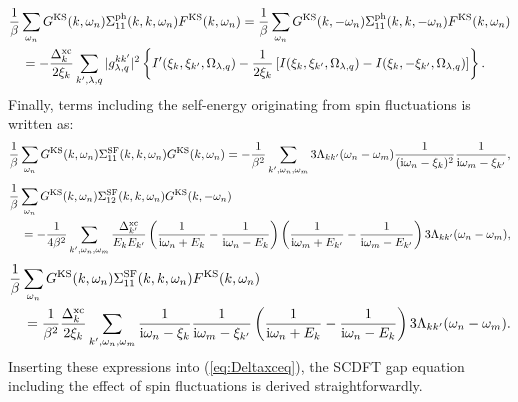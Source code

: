 %
\begin{equation}
	\begin{split}
	&\frac{1}{\beta} \sum_{\omega_n}G^{\rm KS}(k,\omega_n)\Sigma^{\rm ph}_{11}(k,k,\omega_n)F^{\rm KS}(k,\omega_n)
	=\frac{1}{\beta} \sum_{\omega_n}G^{\rm KS}(k,-\omega_n)\Sigma^{\rm ph}_{11}(k,k,-\omega_n)F^{\rm KS}(k,\omega_n)\\
	& \quad = -
	\frac{\Delta^{\rm xc}_{k}}{2\xi_{k}} \sum_{k',\lambda,q} |g^{kk'}_{\lambda,q}|^2
	\left\{ I'(\xi_k,\xi_{k'},\Omega_{\lambda,q})-\frac{1}{2\xi_k}
	\left[ I(\xi_k,\xi_{k'},\Omega_{\lambda,q}) - I(\xi_k,-\xi_{k'},\Omega_{\lambda,q}) \right]\right\}.
	\label{eq:ph11sum2}
	\end{split}
\end{equation}
%
Finally, terms including the self-energy originating from spin fluctuations is written as:
%
\begin{equation}
	\frac{1}{\beta} \sum_{\omega_n}G^{\rm KS}(k,\omega_n)\Sigma^{\rm SF}_{11}(k,k,\omega_n)G^{\rm KS}(k,\omega_n)
	= - \frac{1}{\beta^2}\sum_{k',\omega_n,\omega_m}
	3\Lambda_{kk'}(\omega_n-\omega_m)\frac{1}{({\rm i}\omega_n -\xi_{k})^2}\frac{1}{ {\rm i}\omega_m - \xi_{k'}},
	\label{eq:SF11sum1}
\end{equation}
%
\begin{equation}
	\begin{split}
	&\frac{1}{\beta} \sum_{\omega_n}G^{\rm KS}(k,\omega_n)\Sigma^{\rm SF}_{12}(k,k,\omega_n)G^{\rm KS}(k,-\omega_n)\\
	& \quad = -
	\frac{1}{4\beta^2}\sum_{k',\omega_n,\omega_m}\frac{\Delta^{\rm xc}_{k'}}{E_{k}E_{k'}}
	\left( \frac{1}{ {\rm i}\omega_n+E_k} - \frac{1}{ {\rm i}\omega_n-E_k} \right)
	\left( \frac{1}{ {\rm i}\omega_m+E_{k'}} - \frac{1}{ {\rm i}\omega_m-E_{k'}} \right)
	3\Lambda_{kk'}(\omega_n-\omega_m),
	\label{eq:SF12sum}
	\end{split}
\end{equation}
%
\begin{equation}
\begin{split}
	&\frac{1}{\beta} \sum_{\omega_n}G^{\rm KS}(k,\omega_n)\Sigma^{\rm SF}_{11}(k,k,\omega_n)F^{\rm KS}(k,\omega_n) \\
	&\quad =
	\frac{1}{\beta^2}\frac{\Delta^{\rm xc}_{k}}{2\xi_{k}}\sum_{k',\omega_n,\omega_m}
	\frac{1}{ {\rm i}\omega_n-\xi_k}\frac{1}{ {\rm i}\omega_m-\xi_{k'}}
	\left( \frac{1}{ {\rm i}\omega_n+E_k} - \frac{1}{ {\rm i}\omega_n-E_k} \right)
	3\Lambda_{kk'}(\omega_n-\omega_m).
	\label{eq:SF11sum2}
	\end{split}
\end{equation}
%
Inserting these expressions into (\ref{eq:Deltaxceq}), the SCDFT gap equation including the effect 
of spin fluctuations is derived straightforwardly.




